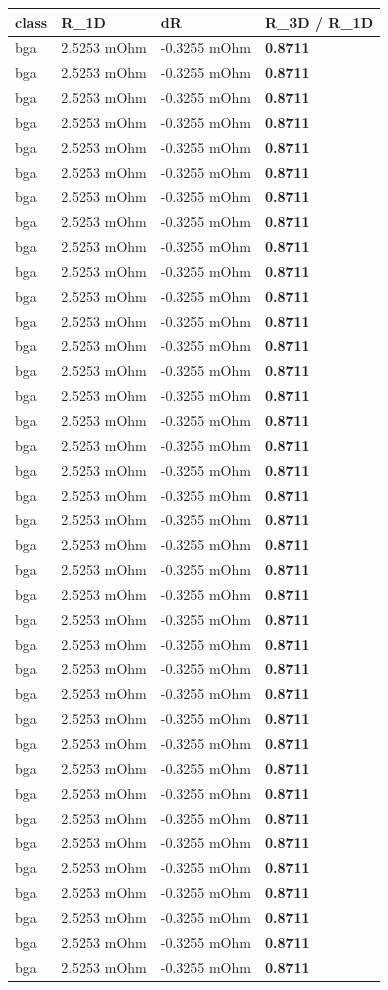 \documentclass[10pt,]{article}
\begin{document}
\begin{longtable}[]{@{}llll@{}}
\toprule
class & R\_1D & dR & R\_3D / R\_1D\tabularnewline
\midrule
\endhead
bga & 2.5253 mOhm & -0.3255 mOhm & \textbf{0.8711}\tabularnewline
bga & 2.5253 mOhm & -0.3255 mOhm & \textbf{0.8711}\tabularnewline
bga & 2.5253 mOhm & -0.3255 mOhm & \textbf{0.8711}\tabularnewline
bga & 2.5253 mOhm & -0.3255 mOhm & \textbf{0.8711}\tabularnewline
bga & 2.5253 mOhm & -0.3255 mOhm & \textbf{0.8711}\tabularnewline
bga & 2.5253 mOhm & -0.3255 mOhm & \textbf{0.8711}\tabularnewline
bga & 2.5253 mOhm & -0.3255 mOhm & \textbf{0.8711}\tabularnewline
bga & 2.5253 mOhm & -0.3255 mOhm & \textbf{0.8711}\tabularnewline
bga & 2.5253 mOhm & -0.3255 mOhm & \textbf{0.8711}\tabularnewline
bga & 2.5253 mOhm & -0.3255 mOhm & \textbf{0.8711}\tabularnewline
bga & 2.5253 mOhm & -0.3255 mOhm & \textbf{0.8711}\tabularnewline
bga & 2.5253 mOhm & -0.3255 mOhm & \textbf{0.8711}\tabularnewline
bga & 2.5253 mOhm & -0.3255 mOhm & \textbf{0.8711}\tabularnewline
bga & 2.5253 mOhm & -0.3255 mOhm & \textbf{0.8711}\tabularnewline
bga & 2.5253 mOhm & -0.3255 mOhm & \textbf{0.8711}\tabularnewline
bga & 2.5253 mOhm & -0.3255 mOhm & \textbf{0.8711}\tabularnewline
bga & 2.5253 mOhm & -0.3255 mOhm & \textbf{0.8711}\tabularnewline
bga & 2.5253 mOhm & -0.3255 mOhm & \textbf{0.8711}\tabularnewline
bga & 2.5253 mOhm & -0.3255 mOhm & \textbf{0.8711}\tabularnewline
bga & 2.5253 mOhm & -0.3255 mOhm & \textbf{0.8711}\tabularnewline
bga & 2.5253 mOhm & -0.3255 mOhm & \textbf{0.8711}\tabularnewline
bga & 2.5253 mOhm & -0.3255 mOhm & \textbf{0.8711}\tabularnewline
bga & 2.5253 mOhm & -0.3255 mOhm & \textbf{0.8711}\tabularnewline
bga & 2.5253 mOhm & -0.3255 mOhm & \textbf{0.8711}\tabularnewline
bga & 2.5253 mOhm & -0.3255 mOhm & \textbf{0.8711}\tabularnewline
bga & 2.5253 mOhm & -0.3255 mOhm & \textbf{0.8711}\tabularnewline
bga & 2.5253 mOhm & -0.3255 mOhm & \textbf{0.8711}\tabularnewline
bga & 2.5253 mOhm & -0.3255 mOhm & \textbf{0.8711}\tabularnewline
bga & 2.5253 mOhm & -0.3255 mOhm & \textbf{0.8711}\tabularnewline
bga & 2.5253 mOhm & -0.3255 mOhm & \textbf{0.8711}\tabularnewline
bga & 2.5253 mOhm & -0.3255 mOhm & \textbf{0.8711}\tabularnewline
bga & 2.5253 mOhm & -0.3255 mOhm & \textbf{0.8711}\tabularnewline
bga & 2.5253 mOhm & -0.3255 mOhm & \textbf{0.8711}\tabularnewline
bga & 2.5253 mOhm & -0.3255 mOhm & \textbf{0.8711}\tabularnewline
bga & 2.5253 mOhm & -0.3255 mOhm & \textbf{0.8711}\tabularnewline
bga & 2.5253 mOhm & -0.3255 mOhm & \textbf{0.8711}\tabularnewline
bga & 2.5253 mOhm & -0.3255 mOhm & \textbf{0.8711}\tabularnewline
bga & 2.5253 mOhm & -0.3255 mOhm & \textbf{0.8711}\tabularnewline

\end{longtable}
\end{document}

